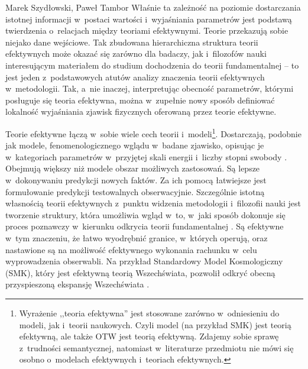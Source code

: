 \begin{artplenv2auth}{Marek Szydłowski, Paweł Tambor}
Właśnie ta zależność na poziomie dostarczania istotnej informacji w~postaci wartości i~wyjaśniania parametrów jest podstawą twierdzenia o~relacjach między teoriami efektywnymi. Teorie przekazują sobie niejako dane wejściowe. Tak zbudowana hierarchiczna struktura teorii efektywnych może okazać się zarówno dla badaczy, jak i~filozofów nauki interesującym materiałem do studium dochodzenia do teorii fundamentalnej -- to jest jeden z~podstawowych atutów analizy znaczenia teorii efektywnych w~metodologii. Tak, a~nie inaczej, interpretując obecność parametrów, którymi posługuje się teoria efektywna, można w~zupełnie nowy sposób definiować lokalność wyjaśniania zjawisk fizycznych oferowaną przez teorie efektywne.

Teorie efektywne łączą w~sobie wiele cech teorii i~modeli\footnote{Wyrażenie ,,teoria efektywna'' jest stosowane zarówno w~odniesieniu do modeli, jak i~teorii naukowych. Czyli model (na przykład SMK) jest teorią efektywną, ale także OTW jest teorią efektywną. Zdajemy sobie sprawę z~trudności semantycznej, natomiast w~literaturze przedmiotu nie mówi się osobno o~modelach efektywnych i~teoriach efektywnych.}. Dostarczają, podobnie jak modele, fenomenologicznego wglądu w~badane zjawisko, opisując je w~kategoriach parametrów w~przyjętej skali energii i~liczby stopni swobody
\parencite[][]{draganescu_effective_2004}. %
 Obejmują większy niż modele obszar możliwych zastosowań. Są lepsze w~dokonywaniu predykcji nowych faktów. Za ich pomocą łatwiejsze jest formułowanie predykcji testowalnych obserwacyjnie. Szczególnie istotną własnością teorii efektywnych z~punktu widzenia metodologii i~filozofii nauki jest tworzenie struktury, która umożliwia wgląd w~to, w~jaki sposób dokonuje się proces poznawczy w~kierunku odkrycia teorii fundamentalnej 
\parencite[][]{castellani_reductionism_2002}. %
 Są efektywne w~tym znaczeniu, że łatwo wyodrębnić granice, w~których operują, oraz nastawione są na możliwość efektywnego wykonania rachunku w~celu wyprowadzenia obserwabli. Na przykład Standardowy Model Kosmologiczny (SMK), który jest efektywną teorią Wszechświata, pozwolił odkryć obecną przyspieszoną ekspansję Wszechświata 
\parencites[][]{perlmutter_discovery_1998}[][]{riess_observational_1998}[por.][]{tegmark_cosmological_2004}. %

\end{artplenv2auth}
